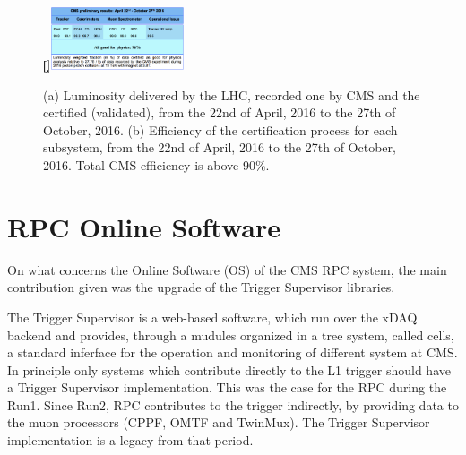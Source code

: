 \begin{figure}%
    \centering
    \qquad
    \c[]{{\includegraphics[width=0.35\textwidth,keepaspectratio]{figures/rpc/lumi_table.png} }}%
    \caption{(a) Luminosity delivered by the LHC, recorded one by CMS and the certified (validated), from the 22nd of April, 2016 to the 27th of October, 2016. (b) Efficiency of the certification process for each subsystem, from the 22nd of April, 2016 to the 27th of October, 2016. Total CMS efficiency is above 90\%. \cite{certification}}%
    \label{lumi}%
\end{figure}



\section{RPC Online Software}

On what concerns the Online Software (OS) of the CMS RPC system, the main contribution given was the upgrade of the Trigger Supervisor libraries.

The Trigger Supervisor is a web-based software, which run over the xDAQ backend and provides, through a mudules organized in a tree system, called cells, a standard inferface for the operation and monitoring of different system at CMS. In principle only systems which contribute directly to the L1 trigger should have a Trigger Supervisor implementation. This was the case for the  RPC during the Run1. Since Run2, RPC contributes to the trigger indirectly, by providing data to the muon processors (CPPF, OMTF and TwinMux). The Trigger Supervisor implementation is a legacy from that period.


